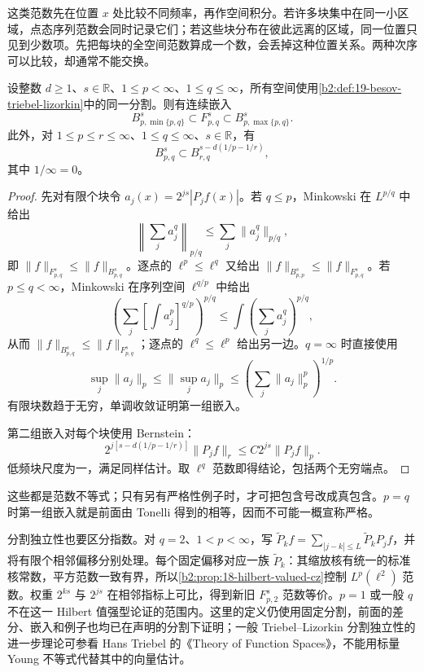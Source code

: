这类范数先在位置 \(x\) 处比较不同频率，再作空间积分。若许多块集中在同一小区域，点态序列范数会同时记录它们；若这些块分布在彼此远离的区域，同一位置只见到少数项。先把每块的全空间范数算成一个数，会丢掉这种位置关系。两种次序可以比较，却通常不能交换。

\begin{proposition}\label{b2:prop:19-besov-triebel-embeddings}
设整数 \(d\geq1\)、\(s\in\mathbb R\)、\(1\leq p<\infty\)、\(1\leq q\leq\infty\)，所有空间使用\cref{b2:def:19-besov-triebel-lizorkin}中的同一分割。则有连续嵌入
\[
 B^s_{p,\min\{p,q\}}\subset F^s_{p,q}
 \subset B^s_{p,\max\{p,q\}}.
\]
此外，对 \(1\leq p\leq r\leq\infty\)、\(1\leq q\leq\infty\)、\(s\in\mathbb R\)，有
\[
 B^s_{p,q}\subset B^{s-d(1/p-1/r)}_{r,q},
\]
其中 \(1/\infty=0\)。
\end{proposition}
\begin{proof}
先对有限个块令 \(a_j(x)=2^{js}|P_jf(x)|\)。若 \(q\leq p\)，Minkowski 在 \(L^{p/q}\) 中给出
\[
 \left\|\sum_j a_j^q\right\|_{p/q}
 \leq\sum_j\|a_j^q\|_{p/q},
\]
即 \(\|f\|_{F^s_{p,q}}\leq\|f\|_{B^s_{p,q}}\)。逐点的 \(\ell^p\leq\ell^q\) 又给出 \(\|f\|_{B^s_{p,p}}\leq\|f\|_{F^s_{p,q}}\)。若 \(p\leq q<\infty\)，Minkowski 在序列空间 \(\ell^{q/p}\) 中给出
\[
 \left(\sum_j\left[\int a_j^p\right]^{q/p}\right)^{p/q}
 \leq\int\left(\sum_j a_j^q\right)^{p/q},
\]
从而 \(\|f\|_{B^s_{p,q}}\leq\|f\|_{F^s_{p,q}}\)；逐点的 \(\ell^q\leq\ell^p\) 给出另一边。\(q=\infty\) 时直接使用
\[
 \sup_j\|a_j\|_p\leq\|\sup_j a_j\|_p
 \leq\left(\sum_j\|a_j\|_p^p\right)^{1/p}.
\]
有限块数趋于无穷，单调收敛证明第一组嵌入。

第二组嵌入对每个块使用 Bernstein：
\[
 2^{j[s-d(1/p-1/r)]}\|P_jf\|_r
 \leq C2^{js}\|P_jf\|_p.
\]
低频块尺度为一，满足同样估计。取 \(\ell^q\) 范数即得结论，包括两个无穷端点。
\end{proof}
这些都是范数不等式；只有另有严格性例子时，才可把包含号改成真包含。\(p=q\) 时第一组嵌入就是前面由 Tonelli 得到的相等，因而不可能一概宣称严格。

\ProseParagraphBreak

分割独立性也要区分指数。对 \(q=2\)、\(1<p<\infty\)，写
\(\widetilde P_kf=\sum_{|j-k|\leq L}\widetilde P_kP_jf\)，并将有限个相邻偏移分别处理。每个固定偏移对应一族 \(\widetilde P_k\)：其缩放核有统一的标准核常数，平方范数一致有界，所以\cref{b2:prop:18-hilbert-valued-cz}控制 \(L^p(\ell^2)\) 范数。权重 \(2^{ks}\) 与 \(2^{js}\) 在相邻指标上可比，得到新旧 \(F^s_{p,2}\) 范数等价。\(p=1\) 或一般 \(q\) 不在这一 Hilbert 值强型论证的范围内。这里的定义仍使用固定分割，前面的差分、嵌入和例子也均已在声明的分割下证明；一般 Triebel--Lizorkin 分割独立性的进一步理论可参看 Hans Triebel 的《Theory of Function Spaces》\cite{Triebel1983Theory}，不能用标量 Young 不等式代替其中的向量估计。

